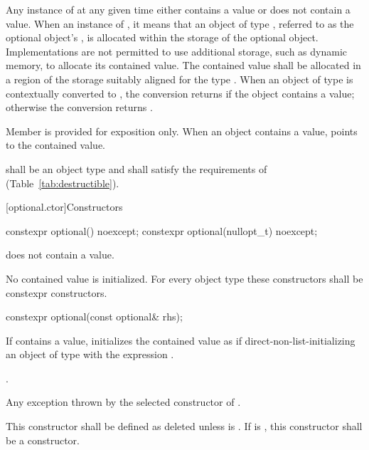 \pnum
Any instance of  at any given time either contains a value or does not contain a value.
When an instance of  ,
it means that an object of type , referred to as the optional object's ,
is allocated within the storage of the optional object.
Implementations are not permitted to use additional storage, such as dynamic memory, to allocate its contained value.
The contained value shall be allocated in a region of the  storage suitably aligned for the type .
When an object of type  is contextually converted to ,
the conversion returns  if the object contains a value;
otherwise the conversion returns .

\pnum
Member  is provided for exposition only. When an  object contains a value,  points to the contained value.

\pnum
{} shall be an object type and shall satisfy the requirements of  (Table~\ref{tab:destructible}).

[optional.ctor]{Constructors}

%
\begin{itemdecl}
constexpr optional() noexcept;
constexpr optional(nullopt_t) noexcept;
\end{itemdecl}

\begin{itemdescr}
\pnum
\postconditions
{} does not contain a value.

\pnum
\remarks
No contained value is initialized.
For every object type  these constructors shall be constexpr constructors.
\end{itemdescr}

%
\begin{itemdecl}
constexpr optional(const optional& rhs);
\end{itemdecl}

\begin{itemdescr}
\pnum
\effects
If  contains a value, initializes the contained value as if
direct-non-list-initializing an object of type  with the expression .

\pnum
\postconditions
{}.

\pnum
\throws
Any exception thrown by the selected constructor of .

\pnum
\remarks
This constructor shall be defined as deleted unless
 is .
If  is ,
this constructor shall be a  constructor.
\end{itemdescr}

